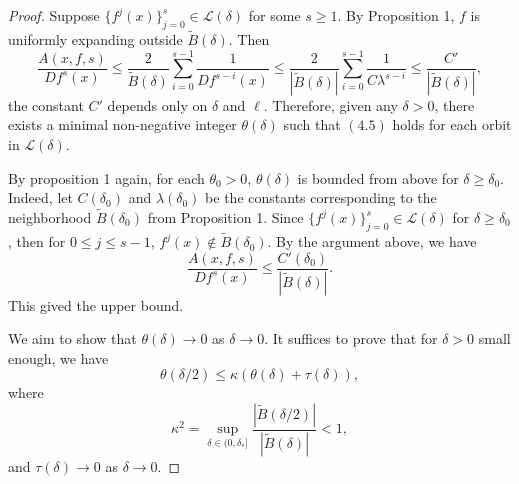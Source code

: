 \documentclass[11pt,oneside]{article}
\theoremstyle{plain}
\numberwithin{equation}{section}
\numberwithin{figure}{section}
\numberwithin{table}{section}
\begin{document}
\iffalse
\begin{proof}


Suppose $\{ f^j(x)\}_{j=0}^s \in \mathcal L(\delta)$ for some $s \geq 1$. By Proposition 1, $f$ is uniformly expanding outside $\tilde B(\delta)$. Then 
\[
\frac{A(x, f, s) }{Df^s(x)} \leq \frac{2}{\tilde B(\delta)} \sum_{i=0}^{s-1} \frac{1}{Df^{s-i}(x)} \leq \frac{2}{|\tilde B(\delta)|} \sum_{i=0}^{s-1} \frac{1}{C \lambda^{s-i}}  \leq \frac{C'}{|\tilde B(\delta)|},
\]
the constant $C'$ depends only on $\delta$ and $\ell$. Therefore, given any $\delta > 0$, there exists a minimal non-negative integer $\theta(\delta)$ such that $(4.5)$ holds for each orbit in $\mathcal L(\delta)$.



By proposition 1 again, for each $\theta_0 > 0$, $\theta(\delta)$ is bounded from above for $\delta \geq \delta_0$. Indeed, let $C(\delta_0)$ and $\lambda(\delta_0)$ be the constants corresponding to the neighborhood $\tilde B(\delta_0)$ from Proposition 1. Since  $\{ f^j(x)\}_{j=0}^s \in \mathcal L(\delta)$ for $\delta \geq \delta_0$, then for $0 \leq j \leq s-1$, $f^j (x) \notin \tilde B(\delta_0)$. By the argument above, we have
\[
\frac{A(x, f, s) }{Df^s(x)} \leq \frac{C'(\delta_0)}{|\tilde B(\delta)|}.
\]
This gived the upper bound. 


We aim to show that $\theta(\delta) \to 0$ as $\delta \to 0$. It suffices to prove that for $\delta > 0$ small enough, we have
\[
\theta(\delta /2) \leq \kappa (\theta(\delta) + \tau (\delta)),
\]
where
\[
\kappa^2 = \sup_{\delta \in (0, \delta_*]} \frac{|\tilde B(\delta/2)|}{|\tilde B(\delta)|} < 1,
\]
and $\tau(\delta) \to 0$ as $\delta \to 0$.



\end{proof}
\end{document}
